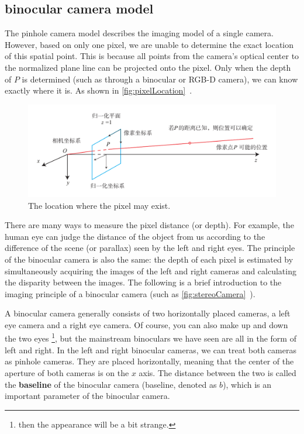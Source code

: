 \subsection{binocular camera model}
The pinhole camera model describes the imaging model of a single camera. However, based on only one pixel, we are unable to determine the exact location of this spatial point. This is because all points from the camera's optical center to the normalized plane line can be projected onto the pixel. Only when the depth of $P$ is determined (such as through a binocular or RGB-D camera), we can know exactly where it is. As shown in \autoref{fig:pixelLocation}~.

\begin{figure}[!ht]
	\centering
	\includegraphics[width=1.0\textwidth]{chapter05/resources/cameraModel/pixelLocation.pdf}
	\caption{The location where the pixel may exist. }
	\label{fig:pixelLocation}
\end{figure}

There are many ways to measure the pixel distance (or depth). For example, the human eye can judge the distance of the object from us according to the difference of the scene (or parallax) seen by the left and right eyes. The principle of the binocular camera is also the same: the depth of each pixel is estimated by simultaneously acquiring the images of the left and right cameras and calculating the disparity between the images. The following is a brief introduction to the imaging principle of a binocular camera (such as \autoref{fig:stereoCamera}~).

A binocular camera generally consists of two horizontally placed cameras, a left eye camera and a right eye camera. Of course, you can also make up and down the two eyes \footnote{ then the appearance will be a bit strange. }, but the mainstream binoculars we have seen are all in the form of left and right. In the left and right binocular cameras, we can treat both cameras as pinhole cameras. They are placed horizontally, meaning that the center of the aperture of both cameras is on the $x$ axis. The distance between the two is called the \textbf{baseline} of the binocular camera (baseline, denoted as $b$), which is an important parameter of the binocular camera.

